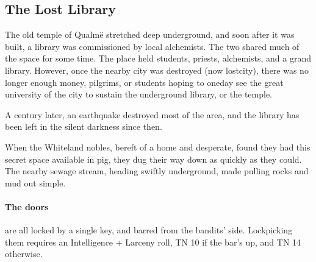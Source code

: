 \begin{multicols}{2}
\begin{enumerate}
\end{enumerate}




\subsection{The Lost Library}\label{sewers}\setcounter{list}{0}

The old temple of Qualm\"{e} stretched deep underground, and soon after it was built, a library was commissioned by local alchemists.  The two shared much of the space for some time.  The place held students, priests, alchemists, and a grand library.  However, once the nearby city was destroyed (now \gls{lostcity}), there was no longer enough money, pilgrims, or students hoping to oneday see the great university of the city to sustain the underground library, or the temple.

A century later, an earthquake destroyed most of the area, and the library has been left in the silent darkness since then.

When the Whiteland nobles, bereft of a home and desperate, found they had this secret space available in \gls{pig}, they dug their way down as quickly as they could.  The nearby sewage stream, heading swiftly underground, made pulling rocks and mud out simple.

\paragraph{The doors} are all locked by a single key, and barred from the bandits' side.
Lockpicking them requires an Intelligence + Larceny roll, TN 10 if the bar's up, and TN 14 otherwise.

\end{multicols}

\label{sewer_map}

